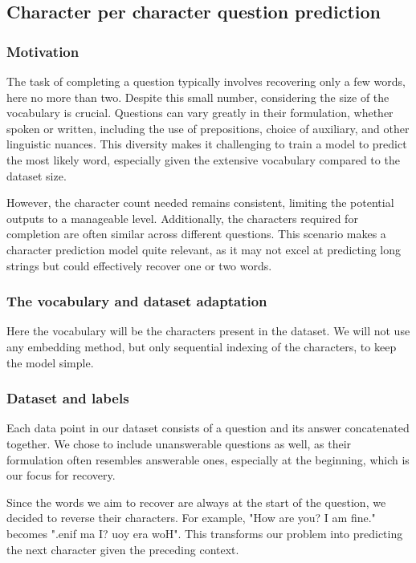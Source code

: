 \documentclass{article}
\begin{document}
\subsection{Character per character question prediction}

\subsubsection{Motivation}
The task of completing a question typically involves recovering only a few words, here no more than two. Despite this small number, considering the size of the vocabulary is crucial. Questions can vary greatly in their formulation, whether spoken or written, including the use of prepositions, choice of auxiliary, and other linguistic nuances. This diversity makes it challenging to train a model to predict the most likely word, especially given the extensive vocabulary compared to the dataset size.

However, the character count needed remains consistent, limiting the potential outputs to a manageable level. Additionally, the characters required for completion are often similar across different questions. This scenario makes a character prediction model quite relevant, as it may not excel at predicting long strings but could effectively recover one or two words.

\subsubsection{The vocabulary and dataset adaptation}
Here the vocabulary will be the characters present in the dataset. We will not use any embedding method, but only sequential indexing of the characters, to keep the model simple. 

\subsubsection{Dataset and labels}
Each data point in our dataset consists of a question and its answer concatenated together. We chose to include unanswerable questions as well, as their formulation often resembles answerable ones, especially at the beginning, which is our focus for recovery.

Since the words we aim to recover are always at the start of the question, we decided to reverse their characters. For example, "How are you? I am fine." becomes ".enif ma I? uoy era woH". This transforms our problem into predicting the next character given the preceding context.
\end{document}
